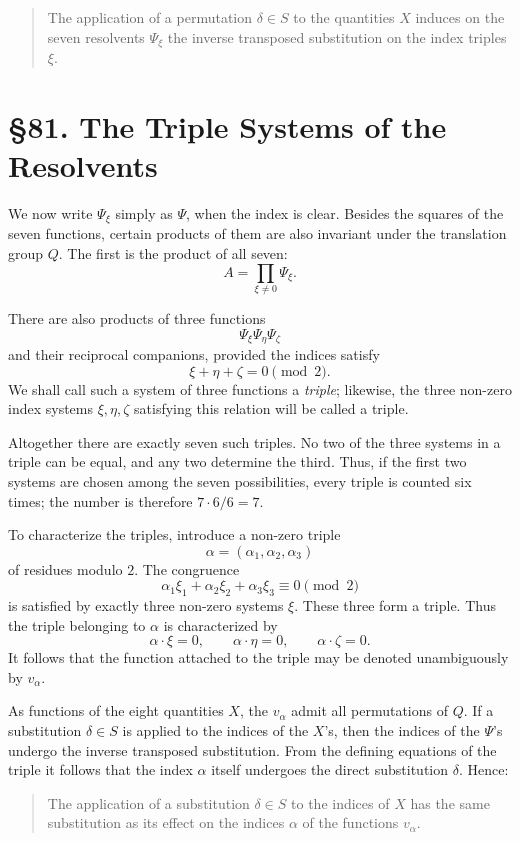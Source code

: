 \documentclass[11pt,a4paper]{book}
\newcommand{\webersection}[2]{\clearpage\section*{\S #1. #2}}
\begin{document}
\begin{quote}
The application of a permutation \(\delta\in S\) to the quantities \(X\) induces on the seven resolvents \(\Psi_\xi\) the inverse transposed substitution on the index triples \(\xi\).
\end{quote}

\webersection{81}{The Triple Systems of the Resolvents}

We now write \(\Psi_\xi\) simply as \(\Psi\), when the index is clear.  Besides the squares of the seven functions, certain products of them are also invariant under the translation group \(Q\).  The first is the product of all seven:
\[
 A=\prod_{\xi\ne0}\Psi_\xi .
\]

There are also products of three functions
\[
 \Psi_\xi\Psi_\eta\Psi_\zeta
\]
and their reciprocal companions, provided the indices satisfy
\[
 \xi+\eta+\zeta=0\pmod2 .
\]
We shall call such a system of three functions a \emph{triple}; likewise, the three non-zero index systems \(\xi,\eta,\zeta\) satisfying this relation will be called a triple.

Altogether there are exactly seven such triples.  No two of the three systems in a triple can be equal, and any two determine the third.  Thus, if the first two systems are chosen among the seven possibilities, every triple is counted six times; the number is therefore \(7\cdot6/6=7\).

To characterize the triples, introduce a non-zero triple
\[
 \alpha=(\alpha_1,\alpha_2,\alpha_3)
\]
of residues modulo \(2\).  The congruence
\[
 \alpha_1\xi_1+\alpha_2\xi_2+\alpha_3\xi_3\equiv0\pmod2
\]
is satisfied by exactly three non-zero systems \(\xi\).  These three form a triple.  Thus the triple belonging to \(\alpha\) is characterized by
\[
 \alpha\cdot\xi=0,\qquad
 \alpha\cdot\eta=0,\qquad
 \alpha\cdot\zeta=0.
\]
It follows that the function attached to the triple may be denoted unambiguously by \(v_\alpha\).

As functions of the eight quantities \(X\), the \(v_\alpha\) admit all permutations of \(Q\).  If a substitution \(\delta\in S\) is applied to the indices of the \(X\)'s, then the indices of the \(\Psi\)'s undergo the inverse transposed substitution.  From the defining equations of the triple it follows that the index \(\alpha\) itself undergoes the direct substitution \(\delta\).  Hence:

\begin{quote}
The application of a substitution \(\delta\in S\) to the indices of \(X\) has the same substitution as its effect on the indices \(\alpha\) of the functions \(v_\alpha\).
\end{quote}
\end{document}
